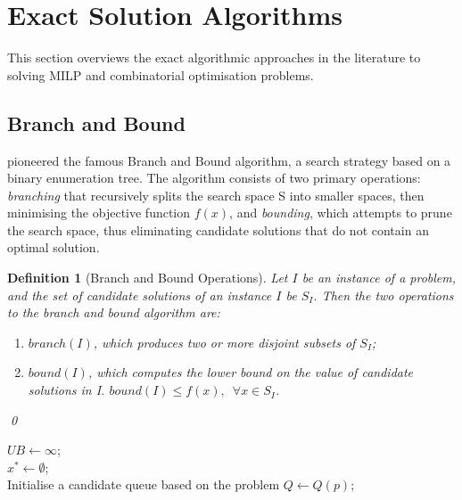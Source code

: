 \documentclass[mscthesis, 11pt]{usiinfthesis}
\theoremstyle{newdefinition}
\newtheorem{definition}{Definition}[section]
\begin{document}
\section{Exact Solution Algorithms}
This section overviews the exact algorithmic approaches in the literature to solving MILP and combinatorial optimisation problems.
\subsection{Branch and Bound}
\cite{land_automatic_1960} pioneered the famous Branch and Bound algorithm, a search strategy based on a binary enumeration tree. The algorithm consists of two primary operations: \emph{branching} that recursively splits the search space S into smaller spaces, then minimising the objective function $f(x)$, and \emph{bounding}, which attempts to prune the search space, thus eliminating candidate solutions that do not contain an optimal solution.
\begin{definition}[Branch and Bound Operations]
Let $I$ be an instance of a problem, and the set of candidate solutions of an instance $I$ be $S_I$. Then the two operations to the branch and bound algorithm are:
\begin{enumerate}[label=\alph*)]
    \item $branch(I)$, which produces two or more disjoint subsets of $S_I$;
    \item $bound(I)$, which computes the lower bound on the value of candidate solutions in I. $bound(I) \leq f(x), \enspace \forall x \in S_I$.
\end{enumerate}  
\qed
\end{definition}

\begin{algorithm}
\caption{Generic Branch and Bound}\label{alg:b_and_b}
$UB \gets \infty$;\\
$x^* \gets \emptyset$;\\
Initialise a candidate queue based on the problem $Q \gets Q(p)$;\\
\end{algorithm}
\end{document}
